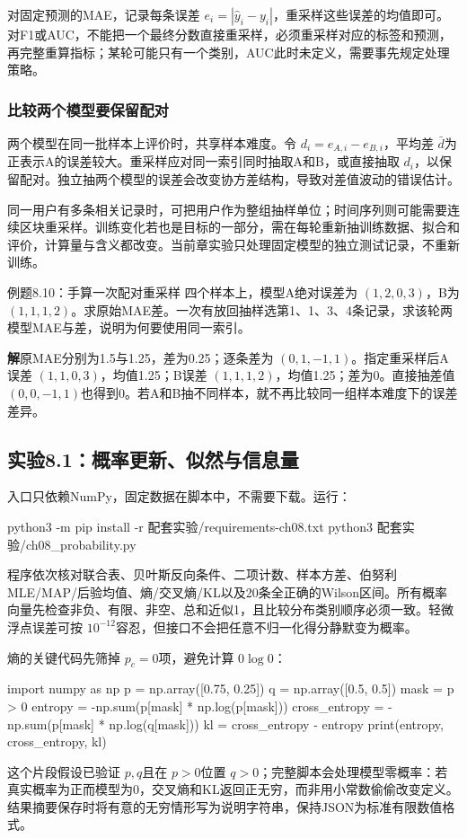 \documentclass[UTF8,fontset=none,zihao=-4,a4paper]{ctexart}
\newcommand{\sol}{\par\noindent\textbf{解}\quad}
\newcommand{\code}[1]{\texttt{\detokenize{#1}}}
\numberwithin{equation}{section}
\numberwithin{figure}{section}
\begin{document}
对固定预测的MAE，记录每条误差 $e_i=|\hat y_i-y_i|$，重采样这些误差的均值即可。对F1或AUC，不能把一个最终分数直接重采样，必须重采样对应的标签和预测，再完整重算指标；某轮可能只有一个类别，AUC此时未定义，需要事先规定处理策略。

\subsubsection{比较两个模型要保留配对}
两个模型在同一批样本上评价时，共享样本难度。令 $d_i=e_{A,i}-e_{B,i}$，平均差 $\bar d$为正表示A的误差较大。重采样应对同一索引同时抽取A和B，或直接抽取 $d_i$，以保留配对。独立抽两个模型的误差会改变协方差结构，导致对差值波动的错误估计。

同一用户有多条相关记录时，可把用户作为整组抽样单位；时间序列则可能需要连续区块重采样。训练变化若也是目标的一部分，需在每轮重新抽训练数据、拟合和评价，计算量与含义都改变。当前章实验只处理固定模型的独立测试记录，不重新训练。

\begin{infobox}{例题8.10：手算一次配对重采样}
四个样本上，模型A绝对误差为 $(1,2,0,3)$，B为 $(1,1,1,2)$。求原始MAE差。一次有放回抽样选第1、1、3、4条记录，求该轮两模型MAE与差，说明为何要使用同一索引。
\end{infobox}
\sol 原MAE分别为1.5与1.25，差为0.25；逐条差为 $(0,1,-1,1)$。指定重采样后A误差 $(1,1,0,3)$，均值1.25；B误差 $(1,1,1,2)$，均值1.25；差为0。直接抽差值 $(0,0,-1,1)$也得到0。若A和B抽不同样本，就不再比较同一组样本难度下的误差差异。

\subsection{实验8.1：概率更新、似然与信息量}
入口\code{配套实验/ch08_probability.py}只依赖NumPy，固定数据在脚本中，不需要下载。运行：
\begin{console}
python3 -m pip install -r 配套实验/requirements-ch08.txt
python3 配套实验/ch08_probability.py
\end{console}
程序依次核对联合表、贝叶斯反向条件、二项计数、样本方差、伯努利MLE/MAP/后验均值、熵/交叉熵/KL以及20条全正确的Wilson区间。所有概率向量先检查非负、有限、非空、总和近似1，且比较分布类别顺序必须一致。轻微浮点误差可按 $10^{-12}$容忍，但接口不会把任意不归一化得分静默变为概率。

熵的关键代码先筛掉 $p_c=0$项，避免计算 $0\log0$：
\begin{pycode}
import numpy as np
p = np.array([0.75, 0.25])
q = np.array([0.5, 0.5])
mask = p > 0
entropy = -np.sum(p[mask] * np.log(p[mask]))
cross_entropy = -np.sum(p[mask] * np.log(q[mask]))
kl = cross_entropy - entropy
print(entropy, cross_entropy, kl)
\end{pycode}
这个片段假设已验证 $p,q$且在 $p>0$位置 $q>0$；完整脚本会处理模型零概率：若真实概率为正而模型为0，交叉熵和KL返回正无穷，而非用小常数偷偷改变定义。结果摘要保存时将有意的无穷情形写为说明字符串，保持JSON为标准有限数值格式。
\end{document}
